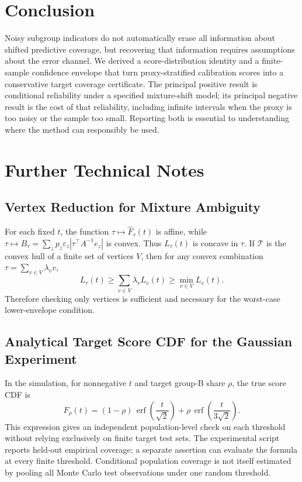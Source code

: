 \documentclass[twoside,11pt]{article}
\begin{document}
\section{Conclusion}
Noisy subgroup indicators do not automatically erase all information about shifted predictive coverage, but recovering that information requires assumptions about the error channel. We derived a score-distribution identity and a finite-sample confidence envelope that turn proxy-stratified calibration scores into a conservative target coverage certificate. The principal positive result is conditional reliability under a specified mixture-shift model; its principal negative result is the cost of that reliability, including infinite intervals when the proxy is too noisy or the sample too small. Reporting both is essential to understanding where the method can responsibly be used.


\appendix
\section{Further Technical Notes}
\subsection{Vertex Reduction for Mixture Ambiguity}
For each fixed $t$, the function $\tau\mapsto\widehat F_\tau(t)$ is affine, while
$\tau\mapsto B_\tau=\sum_zp_z\varepsilon_z|\tau^\top A^{-1}e_z|$ is convex. Thus $L_\tau(t)$ is concave in $\tau$. If $\mathcal T$ is the convex hull of a finite set of vertices $V$, then for any convex combination $\tau=\sum_{v\in V}\lambda_v v$,
\[L_\tau(t)\ge\sum_{v\in V}\lambda_vL_v(t)\ge\min_{v\in V}L_v(t).\]
Therefore checking only vertices is sufficient and necessary for the worst-case lower-envelope condition.

\subsection{Analytical Target Score CDF for the Gaussian Experiment}
In the simulation, for nonnegative $t$ and target group-B share $\rho$, the true score CDF is
\[ F_\rho(t)=(1-\rho)\,\operatorname{erf}\!\left(\frac{t}{\sqrt 2}\right)+\rho\,\operatorname{erf}\!\left(\frac{t}{3\sqrt2}\right).\]
This expression gives an independent population-level check on each threshold without relying exclusively on finite target test sets. The experimental script reports held-out empirical coverage; a separate assertion can evaluate the formula at every finite threshold. Conditional population coverage is not itself estimated by pooling all Monte Carlo test observations under one random threshold.
\end{document}
